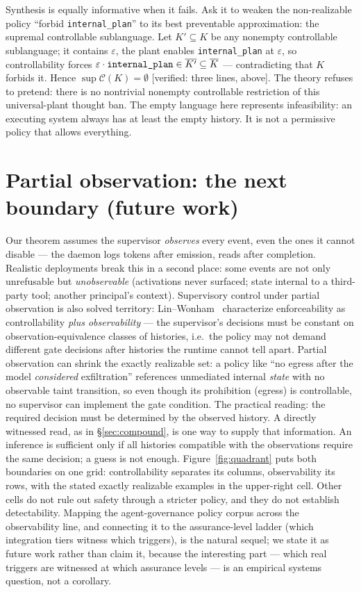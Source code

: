 \documentclass[11pt,a4paper]{article}  \usepackage{mdframed} \usepackage{graphicx} \usepackage{tabularx}
\begin{document}
Synthesis is equally informative when it fails. Ask it to weaken the non-realizable policy ``forbid \texttt{internal\_\allowbreak plan}'' to
its best preventable approximation: the supremal controllable sublanguage. Let $K'\subseteq K$ be any nonempty controllable
sublanguage; it contains $\varepsilon$, the plant enables \texttt{internal\_\allowbreak plan} at $\varepsilon$, so controllability forces
$\varepsilon\cdot\texttt{internal\_\allowbreak plan}\in\overline{K'}\subseteq\overline{K}$ --- contradicting that $K$ forbids it. Hence
$\sup\mathcal{C}(K)=\emptyset$ [verified: three lines, above]. The theory refuses to pretend: there is no nontrivial
nonempty controllable restriction of this universal-plant thought ban. The
empty language here represents infeasibility: an executing system always has
at least the empty history. It is not a permissive policy that allows everything.

\section{Partial observation: the next boundary (future work)}\label{sec:partial} Our theorem assumes the supervisor
\emph{observes} every event, even the ones it cannot disable --- the daemon logs tokens after emission, reads after
completion. Realistic deployments break this in a second place: some events are not only unrefusable but \emph{unobservable}
(activations never surfaced; state internal to a third-party tool; another principal's context). Supervisory control under
partial observation is also solved territory: Lin--Wonham~\cite{lw88} characterize enforceability as controllability
\emph{plus observability} --- the supervisor's decisions must be constant on observation-equivalence classes of histories,
i.e.\ the policy may not demand different gate decisions after histories the runtime cannot tell apart. Partial observation
can shrink the exactly realizable set: a policy like ``no egress after the model \emph{considered} exfiltration'' references
unmediated internal \emph{state} with no observable taint transition, so even though its prohibition (egress) is
controllable, no supervisor can implement the gate condition. The practical reading: the required decision must be determined by the observed history. A directly witnessed read, as in \S\ref{sec:compound}, is one way to supply that information. An inference is sufficient only if all histories compatible with the observations require the same decision; a guess is not enough.
Figure~\ref{fig:quadrant} puts both boundaries on one grid: controllability separates its columns, observability its rows,
with the stated exactly realizable examples in the upper-right cell. Other cells do not rule out safety through a stricter policy, and they do not establish detectability. Mapping the
agent-governance policy corpus across the observability line, and connecting it to the assurance-level ladder (which
integration tiers witness which triggers), is the natural sequel; we state it as future work rather than claim it, because
the interesting part --- which real triggers are witnessed at which assurance levels --- is an empirical systems question,
not a corollary.
\end{document}
